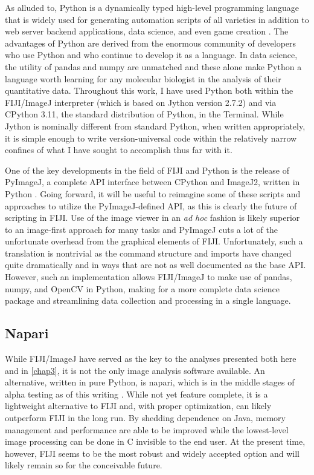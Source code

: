 As alluded to, Python is a dynamically typed high-level programming language that is widely used for generating automation scripts of all varieties in addition to web server backend applications, data science, and even game creation \citep{vanRossum1995}. The advantages of Python are derived from the enormous community of developers who use Python and who continue to develop it as a language. In data science, the utility of pandas and numpy are unmatched and these alone make Python a language worth learning for any molecular biologist in the analysis of their quantitative data. Throughout this work, I have used Python both within the FIJI/ImageJ interpreter (which is based on Jython version 2.7.2) and via CPython 3.11, the standard distribution of Python, in the Terminal. While Jython is nominally different from standard Python, when written appropriately, it is simple enough to write version-universal code within the relatively narrow confines of what I have sought to accomplish thus far with it.

One of the key developments in the field of FIJI and Python is the release of PyImageJ, a complete API interface between CPython and ImageJ2, written in Python \citep{Rueden2022}. Going forward, it will be useful to reimagine some of these scripts and approaches to utilize the PyImageJ-defined API, as this is clearly the future of scripting in FIJI. Use of the image viewer in an \textit{ad hoc} fashion is likely superior to an image-first approach for many tasks and PyImageJ cuts a lot of the unfortunate overhead from the graphical elements of FIJI. Unfortunately, such a translation is nontrivial as the command structure and imports have changed quite dramatically and in ways that are not as well documented as the base API. However, such an implementation allows FIJI/ImageJ to make use of pandas, numpy, and OpenCV in Python, making for a more complete data science package and streamlining data collection and processing in a single language. 

\subsection{Napari}

While FIJI/ImageJ have served as the key to the analyses presented both here and in \autoref{chap3}, it is not the only image analysis software available. An alternative, written in pure Python, is napari, which is in the middle stages of alpha testing as of this writing \citep{napari}. While not yet feature complete, it is a lightweight alternative to FIJI and, with proper optimization, can likely outperform FIJI in the long run. By shedding dependence on Java, memory management and performance are able to be improved while the lowest-level image processing can be done in C invisible to the end user. At the present time, however, FIJI seems to be the most robust and widely accepted option and will likely remain so for the conceivable future.

